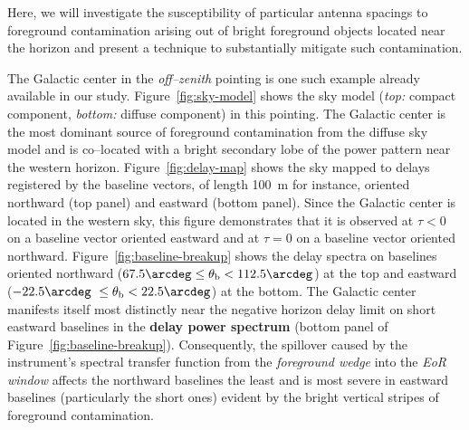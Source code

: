 \documentclass[preprint2,iop,numberedappendix]{emulateapj}
\begin{document}
Here, we will investigate the susceptibility of particular antenna spacings to foreground contamination arising out of bright foreground objects located near the horizon and present a technique to substantially mitigate such contamination.

The Galactic center in the {\it off--zenith} pointing is one such example already available in our study. Figure~\ref{fig:sky-model} shows the sky model ({\it top:} compact component, {\it bottom:} diffuse component) in this pointing. The Galactic center is the most dominant source of foreground contamination from the diffuse sky model and is co--located with a bright secondary lobe of the power pattern near the western horizon. Figure~\ref{fig:delay-map} shows the sky mapped to delays registered by the baseline vectors, of length 100~m for instance, oriented northward (top panel) and eastward (bottom panel). Since the Galactic center is located in the western sky, this figure demonstrates that it is observed at $\tau<0$ on a baseline vector oriented eastward and at $\tau=0$ on a baseline vector oriented northward. Figure~\ref{fig:baseline-breakup} shows the delay spectra on baselines oriented northward ($67.5\arcdeg\le \theta_\textrm{b} < 112.5\arcdeg$) at the top and eastward ($-22.5\arcdeg~\le \theta_\textrm{b} < 22.5\arcdeg$) at the bottom. The Galactic center manifests itself most distinctly near the negative horizon delay limit on short eastward baselines in the {\bf delay power spectrum} (bottom panel of Figure~\ref{fig:baseline-breakup}). Consequently, the spillover caused by the instrument's spectral transfer function from the {\it foreground wedge} into the {\it EoR window} affects the northward baselines the least and is most severe in eastward baselines (particularly the short ones) evident by the bright vertical stripes of foreground contamination. 
\end{document}
